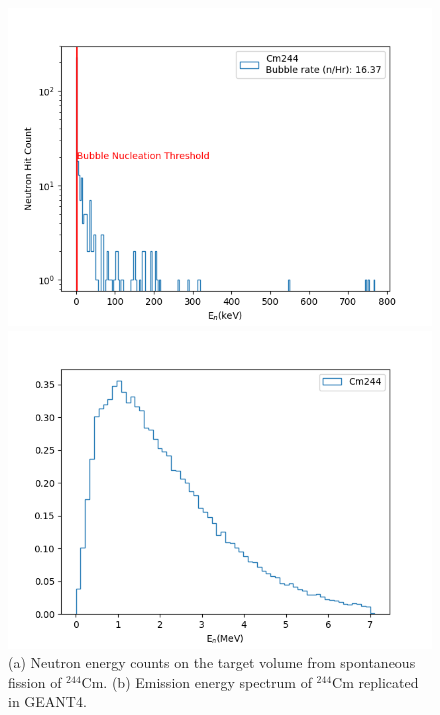 \documentclass[%
12pt,
twoside,
reprint,
amsmath,amssymb,
aps,
]{article}
\begin{document}
	\pagebreak
	\begin{figure}[!t]
		\begin{minipage}{0.5\textwidth}
			\centering
			\includegraphics[width=\linewidth]{Images/cm244_log.png}
		\end{minipage}
		\begin{minipage}{0.5\textwidth}
			\centering
			\includegraphics[width=\linewidth]{Images/cm244_spectrum.png}
		\end{minipage}
		\caption{\label{tab:table-name} (a) Neutron energy counts on the target volume from spontaneous fission of $^{244}$Cm. (b) Emission energy spectrum of $^{244}$Cm replicated in GEANT4.}%
	\end{figure}
\end{document}

